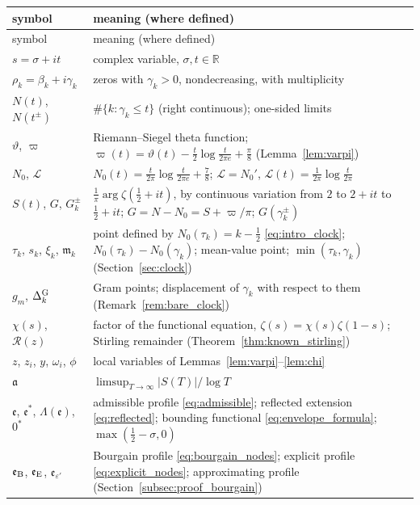 \documentclass[11pt,a4paper]{article}
\makeatletter
\numberwithin{equation}{section}
\DeclareRobustCommand{\CGref}[1]{\ref{#1}}
\DeclareRobustCommand{\CGeqref}[1]{\eqref{#1}}
\let\CG@origref\ref
\let\CG@origeqref\eqref
\newcommand{\CG@gettip}[1]{\@ifundefined{CGTip@#1}{#1}{\csname CGTip@#1\endcsname}}
\DeclareRobustCommand{\CGref}[1]{\pdftooltip{\CG@origref{#1}}{\CG@gettip{#1}}}
\DeclareRobustCommand{\CGeqref}[1]{\pdftooltip{\CG@origeqref{#1}}{\CG@gettip{#1}}}
\theoremstyle{definition}
\theoremstyle{remark}
\newcommand{\Nz}{N_0} %
\newcommand{\lL}{\mathcal L}
\newcommand{\eB}{\mathfrak e_{\rm B}}
\newcommand{\eE}{\mathfrak e_{\rm E}}
\newcommand{\R}{\mathbb R}
\makeatother
\begin{document}
\begin{center}\small
\begin{longtable}{p{}p{}}
\toprule symbol & meaning (where defined)\\\midrule\endfirsthead
\toprule symbol & meaning (where defined)\\\midrule\endhead
\bottomrule\endfoot
$s=\sigma+it$ & complex variable, $\sigma,t\in\R$\\
$\rho_k=\beta_k+i\gamma_k$ & zeros with $\gamma_k>0$, nondecreasing, with multiplicity\\
$N(t)$, $N(t^\pm)$ & $\#\{k:\gamma_k\le t\}$ (right continuous); one-sided limits\\
$\vartheta$, $\varpi$ & Riemann--Siegel theta function; $\varpi(t)=\vartheta(t)-\frac t2\log\frac t{2\pi e}+\frac\pi8$ (Lemma~\CGref{lem:varpi})\\
$\Nz$, $\lL$ & $\Nz(t)=\frac t{2\pi}\log\frac t{2\pi e}+\frac78$; $\lL=\Nz'$, $\lL(t)=\frac1{2\pi}\log\frac t{2\pi}$\\
$S(t)$, $G$, $G_k^\pm$ & $\frac1\pi\arg\zeta(\frac12+it)$, by continuous variation from $2$ to $2+it$ to $\frac12+it$; $G=N-\Nz=S+\varpi/\pi$; $G(\gamma_k^\pm)$\\
$\tau_k$, $s_k$, $\xi_k$, $\mathfrak m_k$ & point defined by $\Nz(\tau_k)=k-\frac12$ \CGeqref{eq:intro_clock}; $\Nz(\tau_k)-\Nz(\gamma_k)$; mean-value point; $\min(\tau_k,\gamma_k)$ (Section~\CGref{sec:clock})\\
$g_m$, $\Delta^{\rm G}_k$ & Gram points; displacement of $\gamma_k$ with respect to them (Remark~\CGref{rem:bare_clock})\\
$\chi(s)$, $\mathcal R(z)$ & factor of the functional equation, $\zeta(s)=\chi(s)\zeta(1-s)$; Stirling remainder (Theorem~\CGref{thm:known_stirling})\\
$z$, $z_i$, $y$, $\omega_i$, $\phi$ & local variables of Lemmas~\CGref{lem:varpi}--\CGref{lem:chi}\\
$\mathfrak a$ & $\limsup_{T\to\infty}|S(T)|/\log T$\\
$\mathfrak e$, $\mathfrak e^*$, $\Lambda(\mathfrak e)$, $0^*$ & admissible profile \CGeqref{eq:admissible}; reflected extension \CGeqref{eq:reflected}; bounding functional \CGeqref{eq:envelope_formula}; $\max(\frac12-\sigma,0)$\\
$\eB$, $\eE$, $\mathfrak e_{\varepsilon'}$ & Bourgain profile \CGeqref{eq:bourgain_nodes}; explicit profile \CGeqref{eq:explicit_nodes}; approximating profile (Section~\CGref{subsec:proof_bourgain})\\

\end{longtable}
\end{center}
\end{document}
